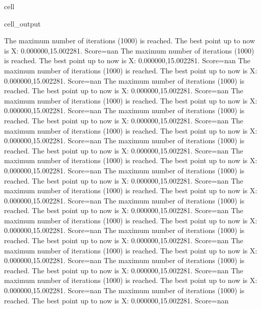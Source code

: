 \documentclass[letterpaper,10pt,english]{jupyterBook}
\begin{document}
\begin{sphinxuseclass}{cell}
\begin{sphinxVerbatimOutput}
\begin{sphinxuseclass}{cell_output}
\begin{sphinxVerbatim}[commandchars=\\\{\}]
The maximum number of iterations (1000) is reached. The best point up to now is X: \PYGZob{}0.000000,15.002281\PYGZcb{}. Score=\PYGZhy{}nan
The maximum number of iterations (1000) is reached. The best point up to now is X: \PYGZob{}0.000000,15.002281\PYGZcb{}. Score=\PYGZhy{}nan
The maximum number of iterations (1000) is reached. The best point up to now is X: \PYGZob{}0.000000,15.002281\PYGZcb{}. Score=\PYGZhy{}nan
The maximum number of iterations (1000) is reached. The best point up to now is X: \PYGZob{}0.000000,15.002281\PYGZcb{}. Score=\PYGZhy{}nan
The maximum number of iterations (1000) is reached. The best point up to now is X: \PYGZob{}0.000000,15.002281\PYGZcb{}. Score=\PYGZhy{}nan
The maximum number of iterations (1000) is reached. The best point up to now is X: \PYGZob{}0.000000,15.002281\PYGZcb{}. Score=\PYGZhy{}nan
The maximum number of iterations (1000) is reached. The best point up to now is X: \PYGZob{}0.000000,15.002281\PYGZcb{}. Score=\PYGZhy{}nan
The maximum number of iterations (1000) is reached. The best point up to now is X: \PYGZob{}0.000000,15.002281\PYGZcb{}. Score=\PYGZhy{}nan
The maximum number of iterations (1000) is reached. The best point up to now is X: \PYGZob{}0.000000,15.002281\PYGZcb{}. Score=\PYGZhy{}nan
The maximum number of iterations (1000) is reached. The best point up to now is X: \PYGZob{}0.000000,15.002281\PYGZcb{}. Score=\PYGZhy{}nan
The maximum number of iterations (1000) is reached. The best point up to now is X: \PYGZob{}0.000000,15.002281\PYGZcb{}. Score=\PYGZhy{}nan
The maximum number of iterations (1000) is reached. The best point up to now is X: \PYGZob{}0.000000,15.002281\PYGZcb{}. Score=\PYGZhy{}nan
The maximum number of iterations (1000) is reached. The best point up to now is X: \PYGZob{}0.000000,15.002281\PYGZcb{}. Score=\PYGZhy{}nan
The maximum number of iterations (1000) is reached. The best point up to now is X: \PYGZob{}0.000000,15.002281\PYGZcb{}. Score=\PYGZhy{}nan
The maximum number of iterations (1000) is reached. The best point up to now is X: \PYGZob{}0.000000,15.002281\PYGZcb{}. Score=\PYGZhy{}nan
The maximum number of iterations (1000) is reached. The best point up to now is X: \PYGZob{}0.000000,15.002281\PYGZcb{}. Score=\PYGZhy{}nan
The maximum number of iterations (1000) is reached. The best point up to now is X: \PYGZob{}0.000000,15.002281\PYGZcb{}. Score=\PYGZhy{}nan
The maximum number of iterations (1000) is reached. The best point up to now is X: \PYGZob{}0.000000,15.002281\PYGZcb{}. Score=\PYGZhy{}nan

\end{sphinxVerbatim}
\end{sphinxuseclass}
\end{sphinxVerbatimOutput}
\end{sphinxuseclass}
\end{document}
